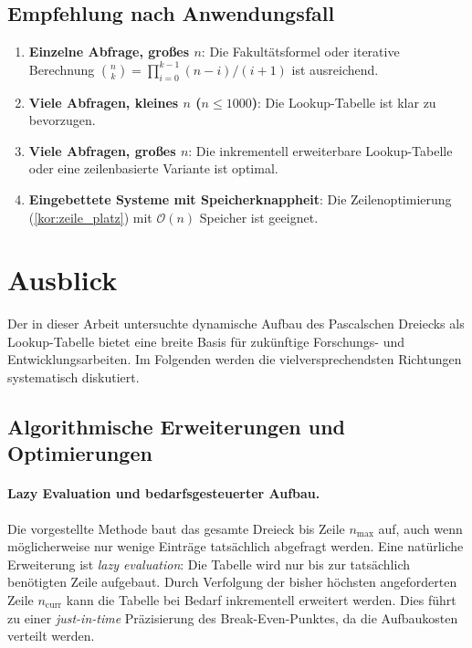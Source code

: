 ﻿\documentclass[12pt, a4paper]{article}
\newcommand{\Oh}{\mathcal{O}}
\theoremstyle{plain}
\theoremstyle{definition}
\theoremstyle{remark}
\renewcommand{\Oh}{\mathcal{O}}
\begin{document}
\subsection{Empfehlung nach Anwendungsfall}

\begin{enumerate}[label=\textbf{Fall \arabic*:}]
  \item \textbf{Einzelne Abfrage, großes $n$}: Die Fakultätsformel oder
        iterative Berechnung $\binom{n}{k} = \prod_{i=0}^{k-1}(n-i)/(i+1)$
        ist ausreichend.
  \item \textbf{Viele Abfragen, kleines $n$ ($n \le 1000$)}:
        Die Lookup-Tabelle ist klar zu bevorzugen.
  \item \textbf{Viele Abfragen, großes $n$}:
        Die inkrementell erweiterbare Lookup-Tabelle oder eine
        zeilenbasierte Variante ist optimal.
  \item \textbf{Eingebettete Systeme mit Speicherknappheit}:
        Die Zeilenoptimierung (\cref{kor:zeile_platz}) mit $\Oh(n)$
        Speicher ist geeignet.
\end{enumerate}


\section{Ausblick}
\label{sec:ausblick}

Der in dieser Arbeit untersuchte dynamische Aufbau des Pascalschen
Dreiecks als Lookup-Tabelle bietet eine breite Basis für zukünftige
Forschungs- und Entwicklungsarbeiten. Im Folgenden werden die
vielversprechendsten Richtungen systematisch diskutiert.

\subsection{Algorithmische Erweiterungen und Optimierungen}

\paragraph{Lazy Evaluation und bedarfsgesteuerter Aufbau.}
Die vorgestellte Methode baut das gesamte Dreieck bis Zeile $n_{\max}$
auf, auch wenn möglicherweise nur wenige Einträge tatsächlich abgefragt
werden. Eine natürliche Erweiterung ist \emph{lazy evaluation}: Die
Tabelle wird nur bis zur tatsächlich benötigten Zeile aufgebaut.
Durch Verfolgung der bisher höchsten angeforderten Zeile $n_{\text{curr}}$
kann die Tabelle bei Bedarf inkrementell erweitert werden. Dies führt zu
einer \emph{just-in-time} Präzisierung des Break-Even-Punktes, da die
Aufbaukosten verteilt werden.
\end{document}
